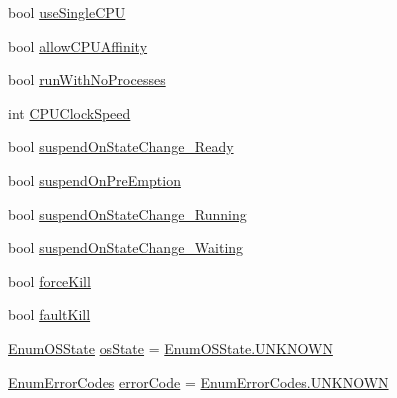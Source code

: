 \begin{DoxyCompactItemize}
\item 
bool \hyperlink{class_c_p_u___o_s___simulator_1_1_operating___system_1_1_o_s_core_ac9667b36d2359ddf024ded0a57ba20be}{use\+Single\+C\+P\+U}
\item 
bool \hyperlink{class_c_p_u___o_s___simulator_1_1_operating___system_1_1_o_s_core_ad3fc35d621bf2c2afc8b2a66fc38d2c0}{allow\+C\+P\+U\+Affinity}
\item 
bool \hyperlink{class_c_p_u___o_s___simulator_1_1_operating___system_1_1_o_s_core_ac0526b86d9657a372e44664acf103438}{run\+With\+No\+Processes}
\item 
int \hyperlink{class_c_p_u___o_s___simulator_1_1_operating___system_1_1_o_s_core_a99f66d92928cea0a61e21ea427f16ab2}{C\+P\+U\+Clock\+Speed}
\item 
bool \hyperlink{class_c_p_u___o_s___simulator_1_1_operating___system_1_1_o_s_core_a2ee0e6e84ca8fd9b7d3daf279d038640}{suspend\+On\+State\+Change\+\_\+\+Ready}
\item 
bool \hyperlink{class_c_p_u___o_s___simulator_1_1_operating___system_1_1_o_s_core_a99875cff5880ff8dce2c77758389491b}{suspend\+On\+Pre\+Emption}
\item 
bool \hyperlink{class_c_p_u___o_s___simulator_1_1_operating___system_1_1_o_s_core_af35a9cd41325505df4cc3894c4b297b4}{suspend\+On\+State\+Change\+\_\+\+Running}
\item 
bool \hyperlink{class_c_p_u___o_s___simulator_1_1_operating___system_1_1_o_s_core_aebfddcf30c39c36876e07017fef6605f}{suspend\+On\+State\+Change\+\_\+\+Waiting}
\item 
bool \hyperlink{class_c_p_u___o_s___simulator_1_1_operating___system_1_1_o_s_core_aaa9fd56285fb7a3d8718f81e8df847ac}{force\+Kill}
\item 
bool \hyperlink{class_c_p_u___o_s___simulator_1_1_operating___system_1_1_o_s_core_a94ab635fc88b9a85556a55c8f2c49b89}{fault\+Kill}
\item 
\hyperlink{namespace_c_p_u___o_s___simulator_1_1_operating___system_a03a98a403abc737c106a8f92db5bffc1}{Enum\+O\+S\+State} \hyperlink{class_c_p_u___o_s___simulator_1_1_operating___system_1_1_o_s_core_ad428ed8c6f24743d016c9ba44ca129a5}{os\+State} = \hyperlink{namespace_c_p_u___o_s___simulator_1_1_operating___system_aea0b669d1bbf5690ae34ac2f8bef9470a696b031073e74bf2cb98e5ef201d4aa3}{Enum\+O\+S\+State.\+U\+N\+K\+N\+O\+W\+N}
\item 
\hyperlink{namespace_c_p_u___o_s___simulator_1_1_operating___system_aea0b669d1bbf5690ae34ac2f8bef9470}{Enum\+Error\+Codes} \hyperlink{class_c_p_u___o_s___simulator_1_1_operating___system_1_1_o_s_core_a321ac6d45675953550f32e23068e194f}{error\+Code} = \hyperlink{namespace_c_p_u___o_s___simulator_1_1_operating___system_aea0b669d1bbf5690ae34ac2f8bef9470a696b031073e74bf2cb98e5ef201d4aa3}{Enum\+Error\+Codes.\+U\+N\+K\+N\+O\+W\+N}

\end{DoxyCompactItemize}
